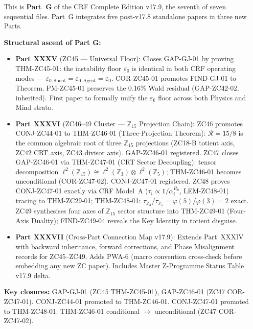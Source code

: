 \documentclass[11pt, a4paper]{article}
\begin{document}
\begin{volumebox}[title={Part G --- CRF Complete Edition v17.9
  (Parts XXXV--XXXVII)}]
\sloppy
This is \textbf{Part~G} of the CRF Complete Edition v17.9, the seventh
of seven sequential files. Part~G integrates five post-v17.8 standalone
papers in three new Parts.

\textbf{Structural ascent of Part G:}
\begin{itemize}[noitemsep,leftmargin=1.5em]
  \item \textbf{Part XXXV} (ZC45 --- Universal Floor):
    Closes GAP-GJ-01 by proving THM-ZC45-01: the instability floor
    $\varepsilon_0$ is identical in both CRF operating modes ---
    $\varepsilon_{0,\mathrm{Spont}} = \varepsilon_{0,\mathrm{Agent}}
    = \varepsilon_0$. COR-ZC45-01 promotes FIND-GJ-01 to Theorem.
    PM-ZC45-01 preserves the 0.16\% Wald residual (GAP-ZC42-02,
    inherited). First paper to formally unify the $\varepsilon_0$
    floor across both Physics and Mind strata.
  \item \textbf{Part XXXVI} (ZC46--49 Cluster ---
    $\mathbb{Z}_{15}$ Projection Chain):
    ZC46 promotes CONJ-ZC44-01 to THM-ZC46-01 (Three-Projection
    Theorem): $\mathcal{R} = 15/8$ is the common algebraic root
    of three $\mathbb{Z}_{15}$ projections (ZC18-B totient axis,
    ZC42 CRT axis, ZC43 divisor axis). GAP-ZC46-01 registered.
    ZC47 closes GAP-ZC46-01 via THM-ZC47-01 (CRT Sector Decoupling):
    tensor decomposition $\ell^2(\mathbb{Z}_{15}) \cong
    \ell^2(\mathbb{Z}_3) \otimes \ell^2(\mathbb{Z}_5)$; THM-ZC46-01
    becomes unconditional (COR-ZC47-02). CONJ-ZC47-01 registered.
    ZC48 proves CONJ-ZC47-01 exactly via CRF Model~A
    ($\tau_i \propto 1/\alpha_i^{R_0}$, LEM-ZC48-01) tracing to
    THM-ZC29-01; THM-ZC48-01: $\tau_{\mathbb{Z}_3}/\tau_{\mathbb{Z}_5}
    = \varphi(5)/\varphi(3) = 2$ exact.
    ZC49 synthesises four axes of $\mathbb{Z}_{15}$ sector structure
    into THM-ZC49-01 (Four-Axis Duality); FIND-ZC49-04 reveals the
    Key Identity in totient disguise.
  \item \textbf{Part XXXVII} (Cross-Part Connection Map v17.9):
    Extends Part~XXXIV with backward inheritance, forward corrections,
    and Phase Misalignment records for ZC45--ZC49. Adds PWA-6
    (macro convention cross-check before embedding any new ZC paper).
    Includes Master Z-Programme Status Table v17.9 delta.
\end{itemize}

\textbf{Key closures:}
GAP-GJ-01 (ZC45 THM-ZC45-01),
GAP-ZC46-01 (ZC47 COR-ZC47-01).
CONJ-ZC44-01 promoted to THM-ZC46-01.
CONJ-ZC47-01 promoted to THM-ZC48-01.
THM-ZC46-01 conditional $\to$ unconditional (ZC47 COR-ZC47-02).


\end{volumebox}
\end{document}
